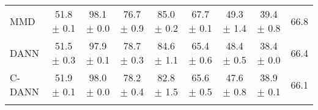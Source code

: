 \documentclass{article}
\newcommand{\coloredBelowRuleSep}[1]{
    \arrayrulecolor{#1}
    \specialrule{\belowrulesep}{0pt}{0pt}
    \arrayrulecolor{black}
}
\newcommand{\coloredBottomrule}[1]{
    \arrayrulecolor{#1}
    \specialrule{\aboverulesep}{0pt}{0pt}
    \arrayrulecolor{black}
    \specialrule{\heavyrulewidth}{0pt}{0pt}
    \coloredBelowRuleSep{white}
}
\begin{document}
\begin{table}
\begin{center}
{\begin{tabular}{lcccccccc}
MMD                       & 51.8 $\pm$ 0.1            & 98.1 $\pm$ 0.0            & 76.7 $\pm$ 0.9            & 85.0 $\pm$ 0.2            & 67.7 $\pm$ 0.1            & 49.3 $\pm$ 1.4            & 39.4 $\pm$ 0.8 & 66.8\\
DANN                      & 51.5 $\pm$ 0.3            & 97.9 $\pm$ 0.1            & 78.7 $\pm$ 0.3            & 84.6 $\pm$ 1.1            & 65.4 $\pm$ 0.6            & 48.4 $\pm$ 0.5            & 38.4 $\pm$ 0.0 & 66.4\\
C-DANN                    & 51.9 $\pm$ 0.1            & 98.0 $\pm$ 0.0            & 78.2 $\pm$ 0.4            & 82.8 $\pm$ 1.5            & 65.6 $\pm$ 0.5            & 47.6 $\pm$ 0.8            & 38.9 $\pm$ 0.1 & 66.1\\
\coloredBottomrule{alternateRowColor}
\end{tabular}}
\end{center}


\end{table}
\end{document}

